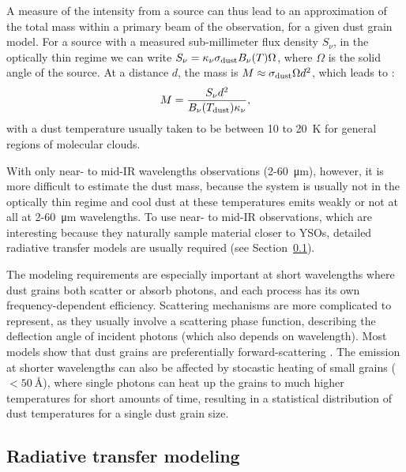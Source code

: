 A measure of the intensity from a source can thus lead to an approximation of the total mass within a primary beam of the observation, for a given dust grain model. For a source with a measured sub-millimeter flux density $S_\nu$, in the optically thin regime we can write $S_\nu=\kappa_\nu\sigma_\textrm{dust}B_\nu(T)\Omega$, where $\Omega$ is the solid angle of the source. At a distance $d$, the mass is $M\approx \sigma_\textrm{dust}\Omega d^2$, which leads to \citep[e.g.][]{Shirley:2000gh}:
\begin{equation}
M = \frac{S_\nu d^2}{B_\nu(T_\textrm{dust})\kappa_\nu},
\end{equation}
with a dust temperature usually taken to be between 10 to \SI{20}{\kelvin} for general regions of molecular clouds. 

With only near- to mid-IR wavelengths observations (2-60~\si{\um}), however, it is more difficult to estimate the dust mass, because the system is usually not in the optically thin regime and cool dust at these temperatures emits weakly or not at all at 2-60~\si{\um} wavelengths. To use near- to mid-IR  observations, which are interesting because they naturally sample material closer to YSOs, detailed radiative transfer models are usually required (see Section~\ref{subsubsec:radiative}).

The modeling requirements are especially important at short wavelengths where
dust grains both scatter or absorb photons, and each process has its own frequency-dependent efficiency. Scattering mechanisms are more complicated to represent, as they usually involve a scattering phase function, describing the deflection angle of incident photons (which also depends on wavelength). Most models show that dust grains are preferentially forward-scattering  \citep{Draine:2011tr}. The emission
at shorter wavelengths can also be affected by stocastic heating of small grains
 ($<\SI{50}{\angstrom}$), where single photons can heat up the grains to much higher temperatures for short amounts of time, resulting in a statistical distribution of dust temperatures for a single dust grain size.

%
%

\subsection{Radiative transfer modeling}
\label{subsubsec:radiative}

